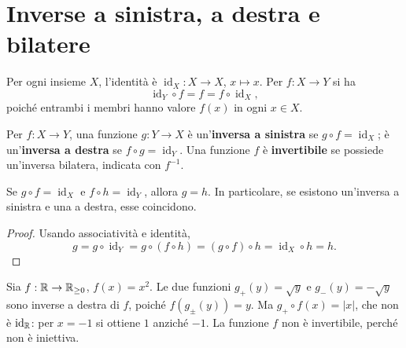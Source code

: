 \section{Inverse a sinistra, a destra e bilatere}
Per ogni insieme $X$, l'identità è $\operatorname{id}_X:X\to X$, $x\mapsto x$. Per $f:X\to Y$ si ha
\[
\operatorname{id}_Y\circ f=f=f\circ\operatorname{id}_X,
\]
poiché entrambi i membri hanno valore $f(x)$ in ogni $x\in X$.

\begin{definizione}
Per $f:X\to Y$, una funzione $g:Y\to X$ è un'\textbf{inversa a sinistra} se $g\circ f=\operatorname{id}_X$; è un'\textbf{inversa a destra} se $f\circ g=\operatorname{id}_Y$. Una funzione $f$ è \textbf{invertibile} se possiede un'inversa bilatera, indicata con $f^{-1}$.
\end{definizione}

\begin{proposizione}
Se $g\circ f=\operatorname{id}_X$ e $f\circ h=\operatorname{id}_Y$, allora $g=h$. In particolare, se esistono un'inversa a sinistra e una a destra, esse coincidono.
\end{proposizione}
\begin{proof}
Usando associatività e identità,
\[
g=g\circ\operatorname{id}_Y=g\circ(f\circ h)
=(g\circ f)\circ h=\operatorname{id}_X\circ h=h.
\]
\end{proof}

\begin{esempio}
Sia $f:\mathbb{R}\to\mathbb{R}_{\ge0}$, $f(x)=x^2$. Le due funzioni $g_+(y)=\sqrt y$ e $g_-(y)=-\sqrt y$ sono inverse a destra di $f$, poiché $f(g_\pm(y))=y$. Ma $g_+\circ f(x)=|x|$, che non è $\operatorname{id}_{\mathbb{R}}$: per $x=-1$ si ottiene $1$ anziché $-1$. La funzione $f$ non è invertibile, perché non è iniettiva.
\end{esempio}

